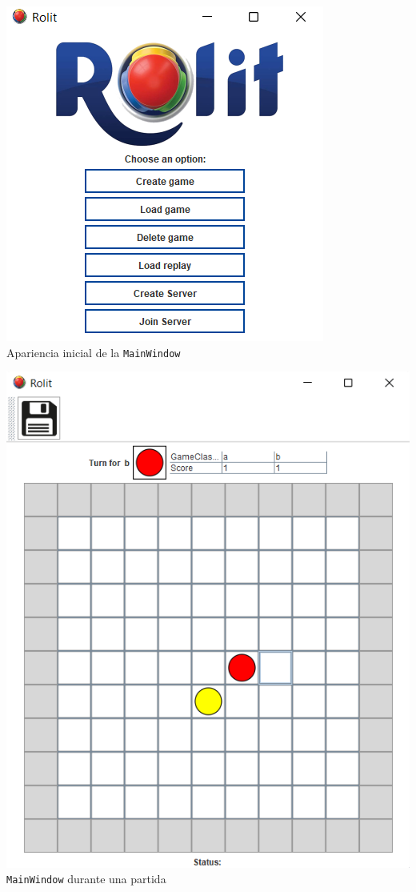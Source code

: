 \documentclass[../DocumentoOficial.tex]{subfiles}
\begin{document}
\begin{center}
\includegraphics[scale=1]{menu-sprint-6.png}\\
Apariencia inicial de la \texttt{MainWindow}
\end{center}

\begin{center}
\includegraphics[scale=0.7]{partida-sprint-6.png}\\
\texttt{MainWindow} durante una partida
\end{center}
\end{document}
